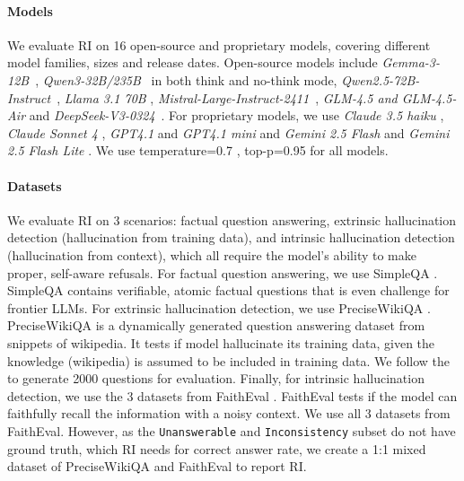 \documentclass{article} %
\theoremstyle{definition}
\begin{document}
\paragraph{Models} We evaluate RI on 16 open-source and proprietary models, covering different model families, sizes and release dates. 
Open-source models include \emph{Gemma-3-12B}~\citep{gemma3_2025}, \emph{Qwen3-32B/235B}~\citep{qwen3_2025} in both think and no-think mode, \emph{Qwen2.5-72B-Instruct}~\citep{qwen2_5_2024}, \emph{Llama 3.1 70B} \citep{llama3_2024}, \emph{Mistral-Large-Instruct-2411}~\citep{mistral_large_2_2024}, \emph{GLM-4.5 and GLM-4.5-Air}\citep{glm45_2025} and \emph{DeepSeek-V3-0324}~\citep{deepseek_v3_2024}. 
For proprietary models, we use \emph{Claude 3.5 haiku} \citep{claude35_2024}, \emph{Claude Sonnet 4} \citep{claude4_2025}, \emph{GPT4.1} and \emph{GPT4.1 mini} \citep{gpt41_2025} and \emph{Gemini 2.5 Flash} and \emph{Gemini 2.5 Flash Lite} \citep{gemini25_2025}. 
We use temperature=0.7 , top-p=0.95 for all models.

\paragraph{Datasets} We evaluate RI on 3 scenarios: factual question answering, extrinsic hallucination detection (hallucination from training data), and intrinsic hallucination detection (hallucination from context), which all require the model's ability to make proper, self-aware refusals. 
For factual question answering, we use SimpleQA \citep{wei2024measuringshortformfactualitylarge}. 
SimpleQA contains verifiable, atomic factual questions that is even challenge for frontier LLMs. 
For extrinsic hallucination detection, we use PreciseWikiQA \citep{bangHalluLensLLMHallucination2025}. 
PreciseWikiQA is a dynamically generated question answering dataset from snippets of wikipedia. 
It tests if model hallucinate its training data, given the knowledge (wikipedia) is assumed to be included in training data. 
We follow the \citet{bangHalluLensLLMHallucination2025} to generate 2000 questions for evaluation. 
Finally, for intrinsic hallucination detection, we use the 3 datasets from FaithEval \citep{ming2025faithevallanguagemodelstay}. 
FaithEval tests if the model can faithfully recall the information with a noisy context. 
We use all 3 datasets from FaithEval. 
However, as the \texttt{Unanswerable} and \texttt{Inconsistency} subset do not have ground truth, which RI needs for correct answer rate, we create a 1:1 mixed dataset of PreciseWikiQA and FaithEval to report RI.
\end{document}
